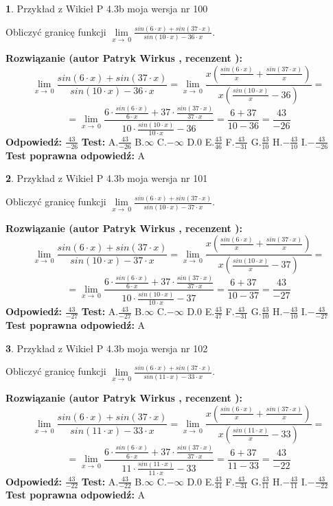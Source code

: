 \documentclass[12pt, a4paper]{article}
\theoremstyle{definition} %
\newtheorem{zad}{}
\newcommand{\zadStart}[1]{\begin{zad}#1\newline}
\newcommand{\zadStop}{\end{zad}}
\newcommand{\rozwStart}[2]{\noindent \textbf{Rozwiązanie (autor #1 , recenzent #2): }\newline}
\newcommand{\rozwStop}{\newline}
\newcommand{\odpStart}{\noindent \textbf{Odpowiedź:}\newline}
\newcommand{\odpStop}{\newline}
\newcommand{\testStart}{\noindent \textbf{Test:}\newline}
\newcommand{\testStop}{\newline}
\newcommand{\kluczStart}{\noindent \textbf{Test poprawna odpowiedź:}\newline}
\newcommand{\kluczStop}{\newline}
\begin{document}
\zadStart{Przykład z Wikieł P 4.3b moja wersja nr 100}


Obliczyć granicę funkcji $\lim\limits_{x\to\ 0}\frac{sin(6 \cdot x)+sin(37 \cdot x)}{sin(10 \cdot x)-36 \cdot x}$.
\zadStop
\rozwStart{Patryk Wirkus}{}
$$\lim\limits_{x\to\ 0}\frac{sin(6 \cdot x)+sin(37 \cdot x)}{sin(10 \cdot x)-36 \cdot x}=\lim\limits_{x\to\ 0}\frac{x(\frac{sin(6 \cdot x)}{x}+\frac{sin(37 \cdot x)}{x})}{x(\frac{sin(10 \cdot x)}{x}-36)}=$$
$$=\lim\limits_{x\to\ 0}\frac{6 \cdot \frac{sin(6 \cdot x)}{6 \cdot x}+37 \cdot \frac{sin(37 \cdot x)}{37 \cdot x}}{10 \cdot \frac{sin(10 \cdot x)}{10 \cdot x}-36}=\frac{6+37}{10-36} = \frac{43}{-26}$$
\rozwStop
\odpStart
$\frac{43}{-26}$
\odpStop
\testStart
A.$\frac{43}{-26}$
B.$\infty$
C.$-\infty$
D.$0$
E.$\frac{43}{46}$
F.$\frac{43}{-31}$
G.$\frac{43}{10}$
H.$-\frac{43}{10}$
I.$-\frac{43}{-26}$
\testStop
\kluczStart
A
\kluczStop



\zadStart{Przykład z Wikieł P 4.3b moja wersja nr 101}


Obliczyć granicę funkcji $\lim\limits_{x\to\ 0}\frac{sin(6 \cdot x)+sin(37 \cdot x)}{sin(10 \cdot x)-37 \cdot x}$.
\zadStop
\rozwStart{Patryk Wirkus}{}
$$\lim\limits_{x\to\ 0}\frac{sin(6 \cdot x)+sin(37 \cdot x)}{sin(10 \cdot x)-37 \cdot x}=\lim\limits_{x\to\ 0}\frac{x(\frac{sin(6 \cdot x)}{x}+\frac{sin(37 \cdot x)}{x})}{x(\frac{sin(10 \cdot x)}{x}-37)}=$$
$$=\lim\limits_{x\to\ 0}\frac{6 \cdot \frac{sin(6 \cdot x)}{6 \cdot x}+37 \cdot \frac{sin(37 \cdot x)}{37 \cdot x}}{10 \cdot \frac{sin(10 \cdot x)}{10 \cdot x}-37}=\frac{6+37}{10-37} = \frac{43}{-27}$$
\rozwStop
\odpStart
$\frac{43}{-27}$
\odpStop
\testStart
A.$\frac{43}{-27}$
B.$\infty$
C.$-\infty$
D.$0$
E.$\frac{43}{47}$
F.$\frac{43}{-31}$
G.$\frac{43}{10}$
H.$-\frac{43}{10}$
I.$-\frac{43}{-27}$
\testStop
\kluczStart
A
\kluczStop



\zadStart{Przykład z Wikieł P 4.3b moja wersja nr 102}


Obliczyć granicę funkcji $\lim\limits_{x\to\ 0}\frac{sin(6 \cdot x)+sin(37 \cdot x)}{sin(11 \cdot x)-33 \cdot x}$.
\zadStop
\rozwStart{Patryk Wirkus}{}
$$\lim\limits_{x\to\ 0}\frac{sin(6 \cdot x)+sin(37 \cdot x)}{sin(11 \cdot x)-33 \cdot x}=\lim\limits_{x\to\ 0}\frac{x(\frac{sin(6 \cdot x)}{x}+\frac{sin(37 \cdot x)}{x})}{x(\frac{sin(11 \cdot x)}{x}-33)}=$$
$$=\lim\limits_{x\to\ 0}\frac{6 \cdot \frac{sin(6 \cdot x)}{6 \cdot x}+37 \cdot \frac{sin(37 \cdot x)}{37 \cdot x}}{11 \cdot \frac{sin(11 \cdot x)}{11 \cdot x}-33}=\frac{6+37}{11-33} = \frac{43}{-22}$$
\rozwStop
\odpStart
$\frac{43}{-22}$
\odpStop
\testStart
A.$\frac{43}{-22}$
B.$\infty$
C.$-\infty$
D.$0$
E.$\frac{43}{44}$
F.$\frac{43}{-31}$
G.$\frac{43}{11}$
H.$-\frac{43}{11}$
I.$-\frac{43}{-22}$
\testStop
\kluczStart
A
\kluczStop
\end{document}
